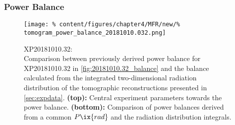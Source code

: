                 \subsubsection*{Power Balance}%
%
                    \begin{figure}[t]%
                        \centering%
                        \captionsetup{width=.47\textwidth}%
                        \begin{minipage}[c]{0.47\textwidth}%
                            \centering%
                            \caption{
                                XP20181010.32:\\%
                                Comparison between previously derived power balance for XP20181010.32 in \cref{fig:20181010.32_balance} and the balance calculated from the integrated two-dimensional radiation distribution of the tomographic reconstructions presented in \cref{sec:expdata}. \textbf{(top):} Central experiment parameters towards the power balance. \textbf{(bottom):} Comparison of power balances derived from a common $P\ix{rad}$ and the radiation distribution integrals.}\label{fig:tomo_experiment_20181010032_balance}%
                        \end{minipage}%
                        \hfill%
                        \begin{minipage}[c]{0.47\textwidth}%
                            \centering%
                            \texttt{[image: \%
                                content/figures/chapter4/MFR/new/\%
                                tomogram\_power\_balance\_20181010.032.png]}%
                        \end{minipage}%
                    \end{figure}%
%
